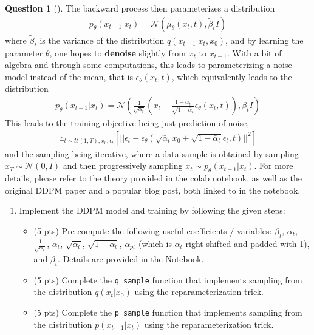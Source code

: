 \documentclass[12pt]{article}
\theoremstyle{definition}
\newtheorem{exercise}{Question}%
\begin{document}
\begin{exercise}[]
The backward process then parameterizes a distribution
\begin{align*}
    p_\theta(x_{t-1} | x_t) = \mathcal{N}(\mu_\theta(x_t, t), \tilde{\beta}_t I)
\end{align*}
where $\tilde{\beta}_t$ is the variance of the distribution $q(x_{t-1} | x_t, x_0)$, and by learning the parameter $\theta$, one hopes to \textbf{denoise} slightly from $x_t$ to $x_{t-1}$. With a bit of algebra and through some computations, this leads to parameterizing a noise model instead of the mean, that is $\epsilon_\theta(x_t, t)$, which equivalently leads to the distribution
\begin{align*}
    p_\theta(x_{t-1} | x_t) = \mathcal{N}(\frac{1}{\sqrt{\alpha_t}} \left(x_t - \frac{1 - \alpha_t}{\sqrt{1 - \bar{\alpha}_t}} \epsilon_\theta(x_t, t)\right), \tilde{\beta}_t I)
\end{align*}
This leads to the training objective being just prediction of noise,
\begin{align*}
    \mathbb{E}_{t\sim \mathcal{U}(1,T), x_0, \epsilon_t} \left[|| \epsilon_t - \epsilon_\theta(\sqrt{\bar{\alpha}_t} x_0 + \sqrt{1 - \bar{\alpha}_t} \epsilon_t, t) ||^2\right]
\end{align*}
and the sampling being iterative, where a data sample is obtained by sampling $x_T \sim \mathcal{N}(0, I)$ and then progressively sampling $x_{t} \sim p_\theta(x_{t-1} | x_t)$. For more details, please refer to the theory provided in the colab notebook, as well as the original DDPM paper and a popular blog post, both linked to in the notebook.
\begin{enumerate}
    \item Implement the DDPM model and training by following the given steps:
    \begin{itemize}
        \item (5 pts) Pre-compute the following useful coefficients / variables: $\beta_t$, $\alpha_t$, $\frac{1}{\sqrt{\alpha_t}}$, $\bar{\alpha_t}$, $\sqrt{\bar{\alpha}_t}$, $\sqrt{1 - \bar{\alpha}_t}$, $\bar{\alpha}_{pt}$ (which is $\bar{\alpha}_t$ right-shifted and padded with 1), and $\tilde{\beta}_t$. Details are provided in the Notebook.
        \item (5 pts) Complete the \texttt{q\_sample} function that implements sampling from the distribution $q(x_t | x_0)$ using the reparameterization trick. 
        \item (5 pts) Complete the \texttt{p\_sample} function that implements sampling from the distribution $p(x_{t-1} | x_t)$ using the reparameterization trick.

\end{itemize}
\end{enumerate}
\end{exercise}
\end{document}
